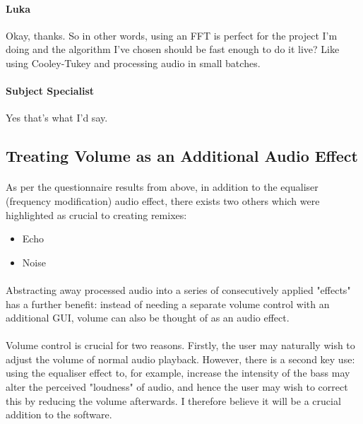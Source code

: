 {{\begin{minipage}{15cm}
			\vspace{12pt}
			
			\paragraph{Luka} Okay, thanks. So in other words, using an FFT is perfect for the project I'm doing and the algorithm I've chosen should be fast enough to do it live? Like using Cooley-Tukey and processing audio in small batches.
			
			\vspace{12pt}
			
			\paragraph{Subject Specialist} Yes that's what I'd say.
			
	\end{minipage}}
}

\pagebreak
\subsection{Treating Volume as an Additional Audio Effect}
\paragraph{}
As per the questionnaire results from above, in addition to the equaliser (frequency modification) audio effect, there exists two others which were highlighted as crucial to creating remixes:
\begin{itemize}
	\item Echo
	\item Noise
\end{itemize}

\paragraph{}
Abstracting away processed audio into a series of consecutively applied "effects" has a further benefit: instead of needing a separate volume control with an additional GUI, volume can also be thought of as an audio effect.

\paragraph{}
Volume control is crucial for two reasons. Firstly, the user may naturally wish to adjust the volume of normal audio playback. However, there is a second key use: using the equaliser effect to, for example, increase the intensity of the bass may alter the perceived "loudness" of audio, and hence the user may wish to correct this by reducing the volume afterwards. I therefore believe it will be a crucial addition to the software.

